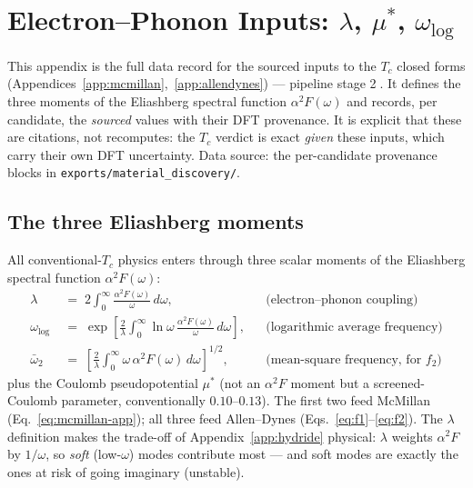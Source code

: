\section{Electron--Phonon Inputs: $\lambda$, $\mu^{*}$, $\omega_{\log}$}
\label{app:elph}

This appendix is the full data record for the sourced inputs to the
$T_c$ closed forms (Appendices~\ref{app:mcmillan},~\ref{app:allendynes})
--- pipeline stage \textcircled{\scriptsize 2}. It defines the three
moments of the Eliashberg spectral function $\alpha^2F(\omega)$ and
records, per candidate, the \emph{sourced} values with their DFT
provenance. It is explicit that these are citations, not recomputes: the
$T_c$ verdict is exact \emph{given} these inputs, which carry their own DFT
uncertainty. Data source: the per-candidate provenance blocks in
\texttt{exports/material\_discovery/}.

\subsection{The three Eliashberg moments}
\label{app:elph-moments}

All conventional-$T_c$ physics enters through three scalar moments of the
Eliashberg spectral function $\alpha^2F(\omega)$:
\begin{align}
\lambda &\;=\; 2\!\int_0^\infty \frac{\alpha^2F(\omega)}{\omega}\,d\omega,
   &&\text{(electron--phonon coupling)} \label{eq:lambda}\\[3pt]
\omega_{\log} &\;=\; \exp\!\left[\frac{2}{\lambda}\!\int_0^\infty
   \ln\omega\,\frac{\alpha^2F(\omega)}{\omega}\,d\omega\right],
   &&\text{(logarithmic average frequency)} \label{eq:wlog}\\[3pt]
\bar\omega_2 &\;=\; \left[\frac{2}{\lambda}\!\int_0^\infty
   \omega\,\alpha^2F(\omega)\,d\omega\right]^{1/2},
   &&\text{(mean-square frequency, for $f_2$)} \label{eq:w2}
\end{align}
plus the Coulomb pseudopotential $\mu^{*}$ (not an $\alpha^2F$ moment but a
screened-Coulomb parameter, conventionally $0.10$--$0.13$). The first two
feed McMillan (Eq.~\ref{eq:mcmillan-app}); all three feed Allen--Dynes
(Eqs.~\ref{eq:f1}--\ref{eq:f2}). The $\lambda$ definition makes the
trade-off of Appendix~\ref{app:hydride} physical: $\lambda$ weights
$\alpha^2F$ by $1/\omega$, so \emph{soft} (low-$\omega$) modes contribute
most --- and soft modes are exactly the ones at risk of going imaginary
(unstable).

